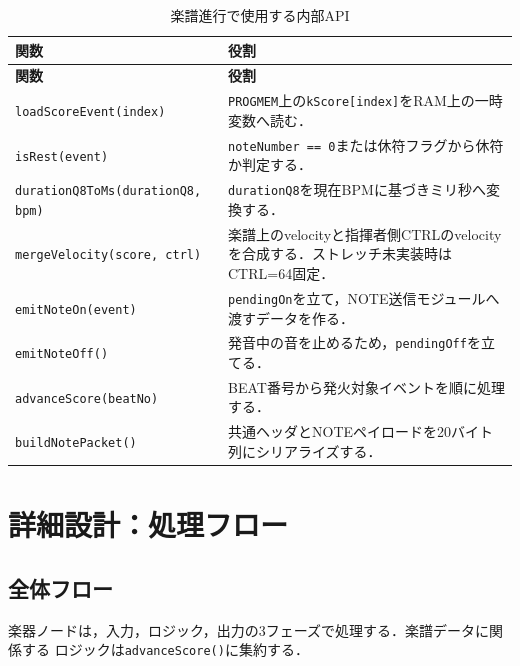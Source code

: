 \documentclass[uplatex,dvipdfmx]{jlreq}
\newcommand{\code}[1]{\texttt{#1}}
\begin{document}
\begin{longtable}{p{}p{}}
\caption{楽譜進行で使用する内部API}\label{tab:api}\\
\toprule
\textbf{関数} & \textbf{役割} \\
\midrule
\endfirsthead
\toprule
\textbf{関数} & \textbf{役割} \\
\midrule
\endhead
\code{loadScoreEvent(index)} &
\code{PROGMEM}上の\code{kScore[index]}をRAM上の一時変数へ読む．\\
\code{isRest(event)} &
\code{noteNumber == 0}または休符フラグから休符か判定する．\\
\code{durationQ8ToMs(durationQ8, bpm)} &
\code{durationQ8}を現在BPMに基づきミリ秒へ変換する．\\
\code{mergeVelocity(score, ctrl)} &
楽譜上のvelocityと指揮者側CTRLのvelocityを合成する．ストレッチ未実装時はCTRL=64固定．\\
\code{emitNoteOn(event)} &
\code{pendingOn}を立て，NOTE送信モジュールへ渡すデータを作る．\\
\code{emitNoteOff()} &
発音中の音を止めるため，\code{pendingOff}を立てる．\\
\code{advanceScore(beatNo)} &
BEAT番号から発火対象イベントを順に処理する．\\
\code{buildNotePacket()} &
共通ヘッダとNOTEペイロードを20バイト列にシリアライズする．\\
\bottomrule
\end{longtable}

\section{詳細設計：処理フロー}

\subsection{全体フロー}

楽器ノードは，入力，ロジック，出力の3フェーズで処理する．楽譜データに関係する
ロジックは\code{advanceScore()}に集約する．
\end{document}
